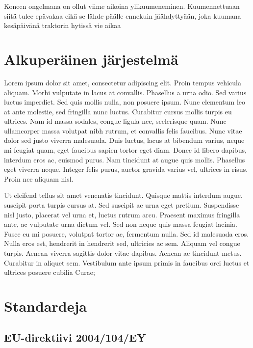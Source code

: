 \documentclass[]{article}
\begin{document}
Koneen ongelmana on ollut viime aikoina ylikuumeneminen. Kuumennettuaan
siitä tulee epävakaa eikä se lähde päälle ennekuin jäähdyttyään, joka
kuumana kesäpäivänä traktorin hytissä vie aikaa

\section{Alkuperäinen
järjestelmä}\label{alkuperuxe4inen-juxe4rjestelmuxe4}

Lorem ipsum dolor sit amet, consectetur adipiscing elit. Proin tempus
vehicula aliquam. Morbi vulputate in lacus at convallis. Phasellus a
urna odio. Sed varius luctus imperdiet. Sed quis mollis nulla, non
posuere ipsum. Nunc elementum leo at ante molestie, sed fringilla nunc
luctus. Curabitur cursus mollis turpis eu ultrices. Nam id massa
sodales, congue ligula nec, scelerisque quam. Nunc ullamcorper massa
volutpat nibh rutrum, et convallis felis faucibus. Nunc vitae dolor sed
justo viverra malesuada. Duis luctus, lacus at bibendum varius, neque mi
feugiat quam, eget faucibus sapien tortor eget diam. Donec id libero
dapibus, interdum eros ac, euismod purus. Nam tincidunt at augue quis
mollis. Phasellus eget viverra neque. Integer felis purus, auctor
gravida varius vel, ultrices in risus. Proin nec aliquam nisl.

Ut eleifend tellus sit amet venenatis tincidunt. Quisque mattis interdum
augue, suscipit porta turpis cursus at. Sed suscipit ac urna eget
pretium. Suspendisse nisl justo, placerat vel urna et, luctus rutrum
arcu. Praesent maximus fringilla ante, ac vulputate urna dictum vel. Sed
non neque quis massa feugiat lacinia. Fusce eu mi posuere, volutpat
tortor ac, fermentum nulla. Sed id malesuada eros. Nulla eros est,
hendrerit in hendrerit sed, ultricies ac sem. Aliquam vel congue turpis.
Aenean viverra sagittis dolor vitae dapibus. Aenean ac tincidunt metus.
Curabitur in aliquet sem. Vestibulum ante ipsum primis in faucibus orci
luctus et ultrices posuere cubilia Curae;

\section{Standardeja}\label{standardeja}

\subsection{EU-direktiivi 2004/104/EY}\label{eu-direktiivi-2004104ey}
\end{document}
